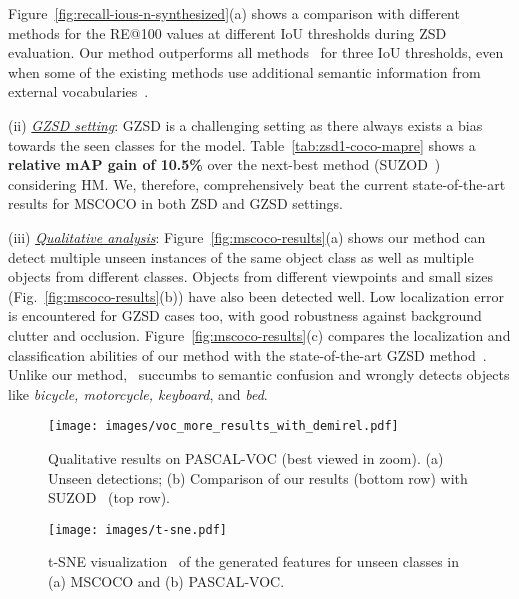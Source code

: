\documentclass{bmvc2k}
\begin{document}
Figure~\ref{fig:recall-ious-n-synthesized}(a) shows a comparison with different methods for the RE@100 values at different IoU thresholds during ZSD evaluation. Our method outperforms all methods~\cite{norouzi2013zero, rahman2018zero, bansal2018zero, yan2020semantics, li2019zero, zhao2020gtnet, zheng2020background, zheng2021zero, yan2022semantics, hayat2020synthesizing} for three IoU thresholds, even when some of the existing methods use additional semantic information from external vocabularies~\cite{bansal2018zero, li2019zero}. 

(ii) \underline{{\em GZSD setting}}: GZSD is a challenging setting as there always exists a bias towards the seen classes for the model. Table~\ref{tab:zsd1-coco-mapre} shows a {\bf relative mAP gain of 10.5\%} over the next-best method (SUZOD~\cite{hayat2020synthesizing}) considering HM. We, therefore, comprehensively beat the current state-of-the-art results for MSCOCO in both ZSD and GZSD settings. 

(iii) \underline{{\em Qualitative analysis}}: Figure~\ref{fig:mscoco-results}(a) shows our method can detect multiple unseen instances of the same object class as well as multiple objects from different classes. Objects from different viewpoints and small sizes (Fig.~\ref{fig:mscoco-results}(b)) have also been detected well. Low localization error is encountered for GZSD cases too, with good robustness against background clutter and occlusion. Figure~\ref{fig:mscoco-results}(c) compares the localization and classification abilities of our method with the state-of-the-art GZSD method~\cite{hayat2020synthesizing}. Unlike our method,~\cite{hayat2020synthesizing} succumbs to semantic confusion and wrongly detects objects like {\em bicycle, motorcycle, keyboard}, and {\em bed}.   


\begin{figure}[t]
	\centering
	\texttt{[image: images/voc\_more\_results\_with\_demirel.pdf]}
	\caption{Qualitative results on PASCAL-VOC (best viewed in zoom). (a) Unseen detections; (b) Comparison of our results (bottom row) with SUZOD~\cite{hayat2020synthesizing} (top row).}
	\label{fig:pascal-results}
\end{figure}  



\begin{figure}[t]
	\centering
	\texttt{[image: images/t-sne.pdf]}
	\caption{t-SNE visualization~\cite{van2014accelerating} of the generated features for unseen classes in (a) MSCOCO and (b) PASCAL-VOC.}
	\label{fig:t-sne}
\end{figure}  
\end{document}
